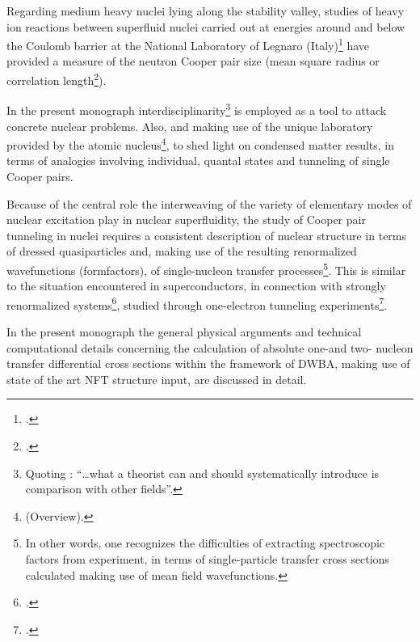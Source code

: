  

Regarding medium heavy nuclei lying along the stability valley,  studies of heavy ion reactions between superfluid nuclei carried out at energies around and  below the Coulomb barrier at the National Laboratory of Legnaro (Italy)\footnote{\cite{Montanari:14}.} have provided a measure of the neutron Cooper pair size (mean square radius or correlation length\footnote{\cite{Potel:21}.}). 


In the present monograph interdisciplinarity\footnote{Quoting \cite{deGennes:74}: ``\dots what a theorist can and should systematically introduce is comparison with other fields''. } is employed as a tool to attack concrete nuclear problems. Also, and  making use of the unique laboratory provided by  the atomic nucleus\footnote{\cite{Bohr:19} (Overview).}, to shed light on condensed matter results, in terms of analogies involving individual, quantal  states and tunneling of single Cooper pairs.


Because of the central role the interweaving of the variety of elementary modes of nuclear excitation play in nuclear superfluidity, the study of Cooper pair tunneling in nuclei requires  a consistent description of nuclear structure in terms of dressed quasiparticles and, making use of the resulting renormalized wavefunctions (formfactors),  of single-nucleon transfer processes\footnote{In other words, one recognizes the difficulties of extracting spectroscopic factors from experiment, in terms of single-particle transfer cross sections calculated making use of mean field wavefunctions.}. This is similar to the situation encountered in superconductors, in connection with strongly renormalized systems\footnote{\cite{Eliashberg:60}.},  studied through one-electron tunneling experiments\footnote{\cite{Giaver:73}.}. 

In the present monograph the general physical arguments and technical computational details concerning the calculation of  absolute one-and two- nucleon  transfer differential cross sections within the framework of DWBA, making use of state of the art NFT structure input, are discussed in detail. 


